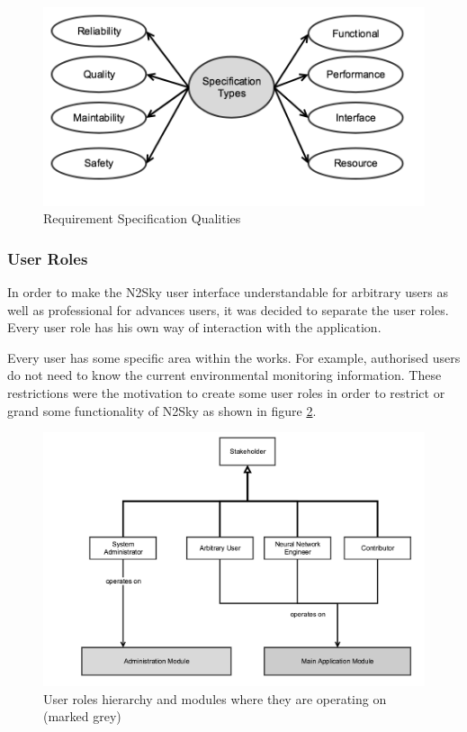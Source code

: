 \begin{figure}[htbp]
\begin{center}
  \includegraphics[width=\linewidth]{components/4/pics/frs_req.png}
  \caption{Requirement Specification Qualities}
  \label{fig:frs_req}
\end{center}
\end{figure}


\subsubsection{User Roles}\label{User Roles}

In order to make the N2Sky user interface understandable for arbitrary users as well as professional for advances users, it was decided to separate the user roles. Every user role has his own way of interaction with the application.

Every user has some specific area within the works. For example, authorised users do not need to know the current environmental monitoring information. These restrictions were the motivation to create some user roles in order to restrict or grand some functionality of N2Sky as shown in figure \ref{fig:userroles}.

\begin{figure}[htbp]
\begin{center}
  \includegraphics[width=\linewidth]{components/4/pics/users.png}
  \caption{User roles hierarchy and modules where they are operating on (marked grey)}
  \label{fig:userroles}
\end{center}
\end{figure}

